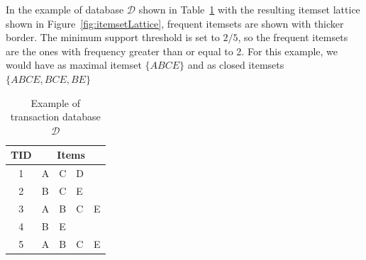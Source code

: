 In the example of database $\mathcal{D}$ shown in Table~\ref{tab:itemsetLattice} with the resulting itemset lattice
shown in Figure~\ref{fig:itemsetLattice}, frequent itemsets are shown with thicker border. The minimum support
threshold is set to $2/5$, so the frequent itemsets are the ones with frequency greater than or equal to 2. For this
example, we would have as maximal itemset $\{ABCE\}$ and as closed itemsets $\{ABCE, BCE, BE\}$

\begin{table}[h!]
  \begin{center}
    \label{tab:itemsetLattice}
      \begin{tabular}{ c | l l l l }
      \toprule
      \textbf{TID} & \multicolumn{4}{c}{\textbf{Items}} \\
      \midrule
	1	& A & C & D & \\
	2 	& B & C & E & \\
	3	& A & B & C & E \\
	4 	& B & E &   & \\
	5	& A & B & C & E \\
      \bottomrule
      \end{tabular}
  \caption{Example of transaction database $\mathcal{D}$ \cite{Pasquier99efficientmining}}
  \end{center}
\end{table}

